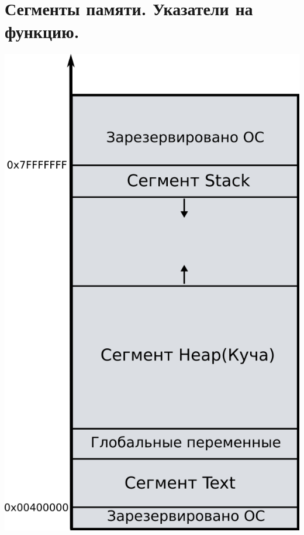 \documentclass{article}
\begin{document}
\section*{Сегменты памяти. Указатели на функцию.}
\begin{center}
\includegraphics[scale=1.35]{../images/memory_layout.png}
\end{center}
\end{document}
